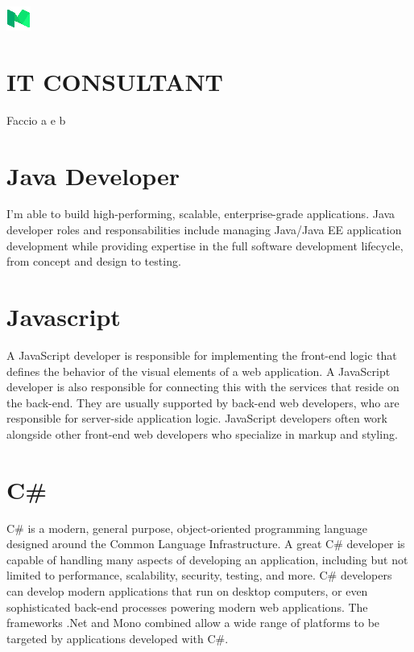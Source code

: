 \documentclass{article}
\begin{document}
	
	\begin{multicols}{2}
		\includegraphics{medium.png}
		\vfill\null			
		\columnbreak		
		
		\section*{IT CONSULTANT}
		Faccio a e b
		
	\end{multicols}
	
	\begin{multicols}{3}
		\section*{Java Developer}
		I'm able to build high-performing, scalable, enterprise-grade applications.
		Java developer roles and responsabilities include managing Java/Java EE application development while providing expertise in the full software development lifecycle, from concept and design to testing.
		\vfill\null			
		\columnbreak
		
		\section*{Javascript}
		A JavaScript developer is responsible for implementing the front-end logic that defines the behavior of the visual elements of a web application. A JavaScript developer is also responsible for connecting this with the services that reside on the back-end. They are usually supported by back-end web developers, who are responsible for server-side application logic. JavaScript developers often work alongside other front-end web developers who specialize in markup and styling.
		\vfill\null			
		\columnbreak
		
		\section*{C\#}
		C\# is a modern, general purpose, object-oriented programming language designed around the Common Language Infrastructure. A great C\# developer is capable of handling many aspects of developing an application, including but not limited to performance, scalability, security, testing, and more. C\# developers can develop modern applications that run on desktop computers, or even sophisticated back-end processes powering modern web applications. The frameworks .Net and Mono combined allow a wide range of platforms to be targeted by applications developed with C\#.
		
	\end{multicols}
\end{document}
